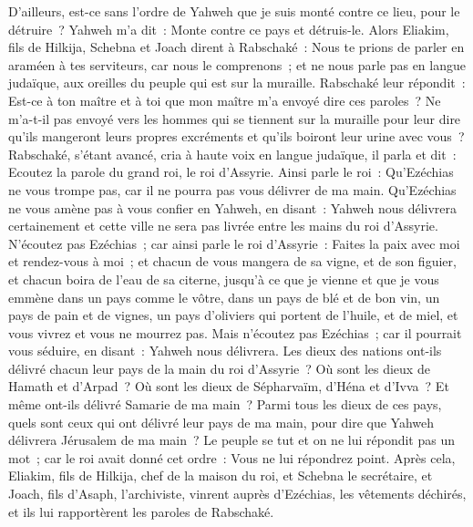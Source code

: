 \begin{multicols}{2}
D'ailleurs, est-ce sans l'ordre de Yahweh que je suis monté contre ce lieu, pour le détruire~? Yahweh m'a dit~: Monte contre ce pays et détruis-le.
Alors Eliakim, fils de Hilkija, Schebna et Joach dirent à Rabschaké~: Nous te prions de parler en araméen à tes serviteurs, car nous le comprenons~; et ne nous parle pas en langue judaïque, aux oreilles du peuple qui est sur la muraille.
Rabschaké leur répondit~: Est-ce à ton maître et à toi que mon maître m'a envoyé dire ces paroles~? Ne m'a-t-il pas envoyé vers les hommes qui se tiennent sur la muraille pour leur dire qu'ils mangeront leurs propres excréments et qu'ils boiront leur urine avec vous~?
Rabschaké, s'étant avancé, cria à haute voix en langue judaïque, il parla et dit~: Ecoutez la parole du grand roi, le roi d'Assyrie.
Ainsi parle le roi~: Qu'Ezéchias ne vous trompe pas, car il ne pourra pas vous délivrer de ma main.
Qu'Ezéchias ne vous amène pas à vous confier en Yahweh, en disant~: Yahweh nous délivrera certainement et cette ville ne sera pas livrée entre les mains du roi d'Assyrie.
N'écoutez pas Ezéchias~; car ainsi parle le roi d'Assyrie~: Faites la paix avec moi et rendez-vous à moi~; et chacun de vous mangera de sa vigne, et de son figuier, et chacun boira de l'eau de sa citerne,
jusqu'à ce que je vienne et que je vous emmène dans un pays comme le vôtre, dans un pays de blé et de bon vin, un pays de pain et de vignes, un pays d'oliviers qui portent de l'huile, et de miel, et vous vivrez et vous ne mourrez pas. Mais n'écoutez pas Ezéchias~; car il pourrait vous séduire, en disant~: Yahweh nous délivrera.
Les dieux des nations ont-ils délivré chacun leur pays de la main du roi d'Assyrie~?
Où sont les dieux de Hamath et d'Arpad~? Où sont les dieux de Sépharvaïm, d'Héna et d'Ivva~? Et même ont-ils délivré Samarie de ma main~?
Parmi tous les dieux de ces pays, quels sont ceux qui ont délivré leur pays de ma main, pour dire que Yahweh délivrera Jérusalem de ma main~?
Le peuple se tut et on ne lui répondit pas un mot~; car le roi avait donné cet ordre~: Vous ne lui répondrez point.
Après cela, Eliakim, fils de Hilkija, chef de la maison du roi, et Schebna le secrétaire, et Joach, fils d'Asaph, l'archiviste, vinrent auprès d'Ezéchias, les vêtements déchirés, et ils lui rapportèrent les paroles de Rabschaké.

\end{multicols}
